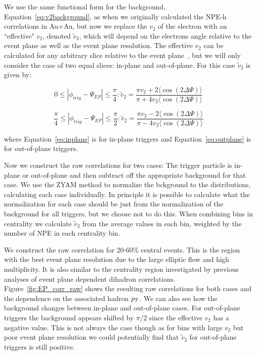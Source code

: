 We use the same functional form for the background, Equation~\ref{eq:v2background}, as when we originally calculated the NPE-h correlations in Au+Au, but now we replace the $v_2$ of the electron with an ``effective" $v_2$, denoted $\widetilde{v}_{2}$, which will depend on the electrons angle relative to the event plane as well as the event plane resolution. The effective $v_2$ can be calculated for any arbitrary slice relative to the event plane~\cite{STAREPLong}, but we will only consider the case of two equal slices: in-plane and out-of-plane. For this case $\widetilde{v}_{2}$ is given by:

\begin{equation}\label{eq:inplane}
0 \leq |\phi_{trig} - \Psi_{EP}| \leq \frac{\pi}{4} : 
	  \widetilde{v}_{2} = \frac{\pi v_{2} + 2 \langle\cos(2\Delta\Psi)\rangle}
						{\pi + 4 v_{2}  \langle\cos(2\Delta\Psi)\rangle}
\end{equation}

\begin{equation}\label{eq:outplane}
\frac{\pi}{4} \leq |\phi_{trig} - \Psi_{EP}| \leq \frac{\pi}{2} : 
           \widetilde{v}_{2} = \frac{\pi v_{2} - 2 \langle\cos(2\Delta\Psi)\rangle}
						{\pi - 4 v_{2}  \langle\cos(2\Delta\Psi)\rangle}
\end{equation}

where Equation~\ref{eq:inplane} is for in-plane triggers and Equation~\ref{eq:outplane} is for out-of-plane triggers.

Now we construct the raw correlations for two cases: The trigger particle is in-plane or out-of-plane and then subtract off the appropriate background for that case. We use the ZYAM method to normalize the bckground to the distributions, calculating each case individually. In principle it is possible to calculate what the normalization for each case should be just from the normalization of the background for all triggers, but we choose not to do this. When combining bins in centrality we calculate $\widetilde{v}_{2}$ from the average values in each bin, weighted by the number of NPE in each centrality bin.

We construct the raw correlation for 20-60\% central events. This is the region with the best event plane resolution due to the large elliptic flow and high multiplicity. It is also similar to the centrality region investigated by previous analyses of event plane dependent dihadron correlations. Figure~\ref{fig:EP_corr_raw} shows the resulting raw correlations for both cases and the dependence on the associated hadron $p_{T}$. We can also see how the background changes between in-plane and out-of-plane cases. For out-of-plane triggers the background appears shifted by $\pi/2$ since the effective $v_2$ has a negative value. This is not always the case though as for bins with large $v_2$ but poor event plane resolution we could potentially find that $\widetilde{v}_{2}$ for out-of-plane triggers is still positive.

